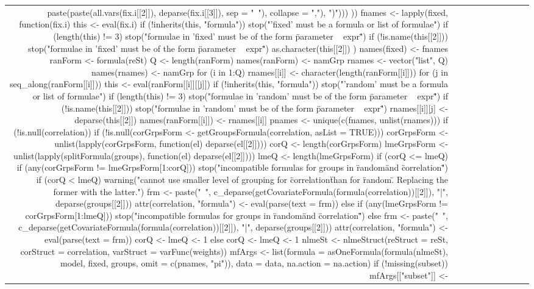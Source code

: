 \begin{table}[H]
\begin{tabular}{rlrrrrrlrr}
{{{{{{{{{{{{paste(paste(all.vars(fix.i[[2]]),             deparse(fix.i[[3]]), sep = "~"), collapse = ","),             ")")))    }))    fnames <- lapply(fixed, function(fix.i) {        this <- eval(fix.i)        if (!inherits(this, "formula"))             stop("'fixed' must be a formula or list of formulae")        if (length(this) != 3)             stop("formulae in 'fixed' must be of the form \"parameter ~ expr\"")        if (!is.name(this[[2]]))             stop("formulae in 'fixed' must be of the form \"parameter ~ expr\"")        as.character(this[[2]])    })    names(fixed) <- fnames    ranForm <- formula(reSt)    Q <- length(ranForm)    names(ranForm) <- namGrp    rnames <- vector("list", Q)    names(rnames) <- namGrp    for (i in 1:Q) {        rnames[[i]] <- character(length(ranForm[[i]]))        for (j in seq_along(ranForm[[i]])) {            this <- eval(ranForm[[i]][[j]])            if (!inherits(this, "formula"))                 stop("'random' must be a formula or list of formulae")            if (length(this) != 3)                 stop("formulae in 'random' must be of the form \"parameter ~ expr\"")            if (!is.name(this[[2]]))                 stop("formulae in 'random' must be of the form \"parameter ~ expr\"")            rnames[[i]][j] <- deparse(this[[2]])        }        names(ranForm[[i]]) <- rnames[[i]]    }    pnames <- unique(c(fnames, unlist(rnames)))    if (!is.null(correlation)) {        if (!is.null(corGrpsForm <- getGroupsFormula(correlation,             asList = TRUE))) {            corGrpsForm <- unlist(lapply(corGrpsForm, function(el) deparse(el[[2]])))            corQ <- length(corGrpsForm)            lmeGrpsForm <- unlist(lapply(splitFormula(groups),                 function(el) deparse(el[[2]])))            lmeQ <- length(lmeGrpsForm)            if (corQ <= lmeQ) {                if (any(corGrpsForm != lmeGrpsForm[1:corQ])) {                  stop("incompatible formulas for groups in \"random\" and \"correlation\"")                }                if (corQ < lmeQ) {                  warning("cannot use smaller level of grouping for \"correlation\" than for \"random\". Replacing the former with the latter.")                  frm <- paste("~", c_deparse(getCovariateFormula(formula(correlation))[[2]]),                     "|", deparse(groups[[2]]))                  attr(correlation, "formula") <- eval(parse(text = frm))                }            }            else {                if (any(lmeGrpsForm != corGrpsForm[1:lmeQ])) {                  stop("incompatible formulas for groups in \"random\" and \"correlation\"")                }            }        }        else {            frm <- paste("~", c_deparse(getCovariateFormula(formula(correlation))[[2]]),                 "|", deparse(groups[[2]]))            attr(correlation, "formula") <- eval(parse(text = frm))            corQ <- lmeQ <- 1        }    }    else {        corQ <- lmeQ <- 1    }    nlmeSt <- nlmeStruct(reStruct = reSt, corStruct = correlation,         varStruct = varFunc(weights))    mfArgs <- list(formula = asOneFormula(formula(nlmeSt), model,         fixed, groups, omit = c(pnames, "pi")), data = data,         na.action = na.action)    if (!missing(subset)) {        mfArgs[["subset"]] <- }}}}}}}}}}}}
\end{tabular}
\end{table}

